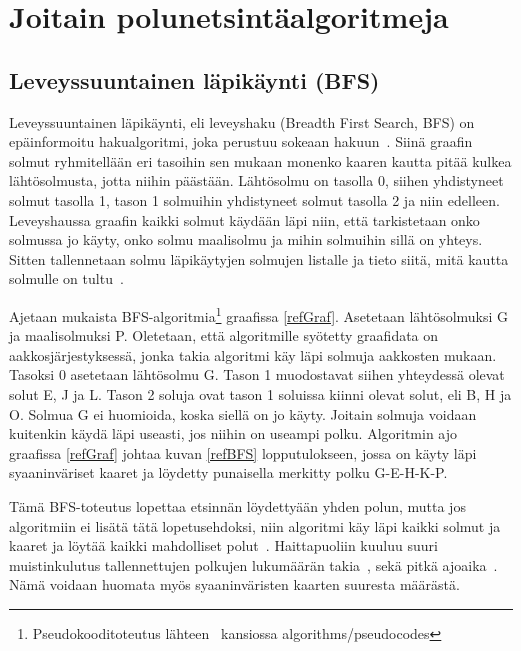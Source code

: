\chapter{Joitain polunetsintäalgoritmeja}\label{joitainP}

\section{Leveyssuuntainen läpikäynti (BFS)}\label{bfs}
Leveyssuuntainen läpikäynti, eli leveyshaku (Breadth First Search, BFS) on 
epäinformoitu hakualgoritmi, joka perustuu sokeaan 
hakuun~\cite{applSciLawande}. Siinä graafin solmut ryhmitellään eri tasoihin 
sen mukaan monenko kaaren kautta pitää kulkea lähtösolmusta, jotta niihin 
päästään. Lähtösolmu on tasolla 0, siihen yhdistyneet solmut tasolla 1, 
tason 1 solmuihin yhdistyneet solmut tasolla 2 ja niin edelleen. 
Leveyshaussa graafin kaikki solmut käydään läpi niin, että tarkistetaan 
onko solmussa jo käyty, onko solmu maalisolmu ja mihin solmuihin sillä on 
yhteys. Sitten tallennetaan solmu läpikäytyjen solmujen listalle ja tieto 
siitä, mitä kautta solmulle on tultu~\cite{BFSRahim}. \par
	Ajetaan \textcite{applSciLawande} mukaista 
BFS-algoritmia\footnote{Pseudokooditoteutus lähteen~\cite{gt2} kansiossa 
algorithms/pseudocodes} graafissa \ref{refGraf}. Asetetaan lähtösolmuksi G ja 
maalisolmuksi P. Oletetaan, että algoritmille syötetty graafidata on 
aakkosjärjestyksessä, jonka takia algoritmi käy läpi solmuja aakkosten mukaan. 
Tasoksi 0 asetetaan lähtösolmu G. Tason 1 muodostavat siihen yhteydessä olevat 
solut E, J ja L. Tason 2 soluja ovat tason 1 soluissa kiinni olevat solut, eli 
B, H ja O. Solmua G ei huomioida, koska siellä on jo käyty. Joitain solmuja 
voidaan kuitenkin käydä läpi useasti, jos niihin on useampi polku. Algoritmin 
ajo graafissa \ref{refGraf} johtaa kuvan \ref{refBFS} lopputulokseen, jossa on 
käyty läpi syaaninväriset kaaret ja löydetty punaisella merkitty polku 
G-E-H-K-P. \par
	Tämä BFS-toteutus lopettaa etsinnän löydettyään yhden polun, mutta jos 
algoritmiin ei lisätä tätä lopetusehdoksi, niin algoritmi käy läpi kaikki 
solmut ja kaaret ja löytää kaikki mahdolliset polut~\cite{BFSRahim}. 
Haittapuoliin kuuluu suuri muistinkulutus tallennettujen polkujen lukumäärän 
takia~\cite{BFSRahim}, sekä pitkä ajoaika~\cite{mazeGameTrilogi}. Nämä voidaan 
huomata myös syaaninväristen kaarten suuresta määrästä.

